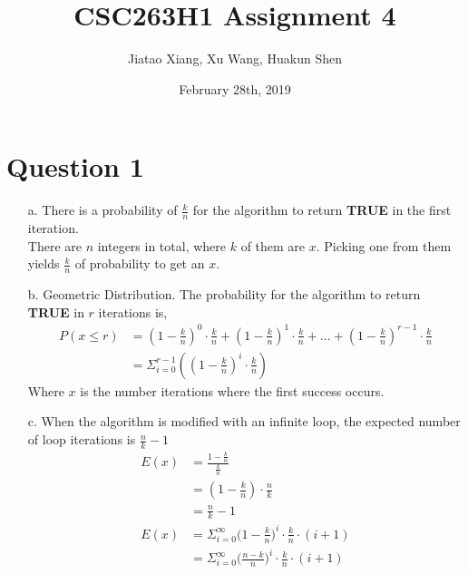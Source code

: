 \documentclass[10pt]{article}
\title{CSC263H1 Assignment 4}
\author{Jiatao Xiang, Xu Wang, Huakun Shen}
\date{February 28th, 2019}
\begin{document}
\lstset{style=mystyle}
\maketitle
\section*{Question 1}
\begin{enumerate}
\item[a.] There is a probability of $\frac{k}{n}$ for the algorithm to return \textbf{TRUE} in the first iteration.\\
There are $n$ integers in total, where $k$ of them are $x$. Picking one from them yields $\frac{k}{n}$ of probability to get an $x$.

\item[b.] Geometric Distribution. The probability for the algorithm to return \textbf{TRUE} in $r$ iterations is,
\begin{align*}
P(x\leq r)&=(1-\frac{k}{n})^0\cdot \frac{k}{n}+(1-\frac{k}{n})^1\cdot \frac{k}{n}+...+(1-\frac{k}{n})^{r-1}\cdot \frac{k}{n}\\
&=\Sigma^{r-1}_{i=0}((1-\frac{k}{n})^i\cdot \frac{k}{n})
\end{align*}
Where $x$ is the number iterations where the first success occurs.
\item[c.] When the algorithm is modified with an infinite loop, the expected number of loop iterations is $\frac{n}{k}-1$
\begin{align*}
E(x)&=\frac{1-\frac{k}{n}}{\frac{k}{n}}\\
&=(1-\frac{k}{n})\cdot\frac{n}{k}\\
&=\frac{n}{k}-1\\
E(x)&=\Sigma^\infty_{i=0}\Big(1-\frac{k}{n}\Big)^i\cdot\frac{k}{n}\cdot(i+1)\\
&=\Sigma^\infty_{i=0}\Big(\frac{n-k}{n}\Big)^i\cdot\frac{k}{n}\cdot(i+1)
\end{align*}
\end{enumerate}
\end{document}
